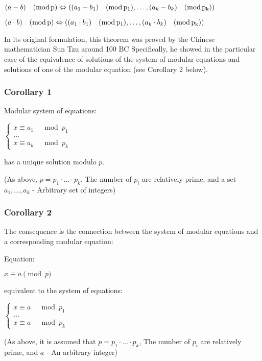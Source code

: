 $(a-b)\quad({\rm mod\, p})\Leftrightarrow\left((a_{1}-b_{1})\quad({\rm mod\, p_{1}}),\ldots,(a_{k}-b_{k})\quad({\rm mod\, p_{k}})\right)$

$(a\cdot b)\quad({\rm mod\, p})\Leftrightarrow\left((a_{1}\cdot b_{1})\quad({\rm mod\, p_{1}}),\ldots,(a_{k}\cdot b_{k})\quad({\rm mod\, p_{k}})\right)$

In its original formulation, this theorem was proved by the Chinese mathematician Sun Tzu around 100 BC Specifically, he showed in the particular case of the equivalence of solutions of the system of modular equations and solutions of one of the modular equation (see Corollary 2 below).

\subsubsection{ Corollary 1 }

Modular system of equations:

$\begin{cases}
x\equiv a_{1} & \mod p_{1}\\
\ldots\\
x\equiv a_{k} & \mod p_{k}
\end{cases}
 $

has a unique solution modulo $p$.

(As above, $p = p_1 \cdot \ldots \cdot p_k$, The number of $p_i$ are relatively prime, and a set $a_1, \ldots, a_k$ - Arbitrary set of integers)

\subsubsection{ Corollary 2 }

The consequence is the connection between the system of modular equations and a corresponding modular equation:

Equation:

$x \equiv a \pmod p$

equivalent to the system of equations:

$\begin{cases}
x\equiv a & \mod p_{1}\\
\ldots\\
x\equiv a & \mod p_{k}
\end{cases}$

(As above, it is assumed that $p = p_1 \cdot \ldots \cdot p_k$, The number of $p_i$ are relatively prime, and $a$ - An arbitrary integer)

